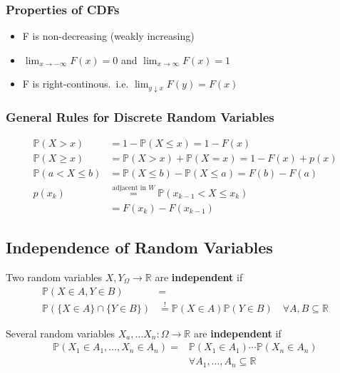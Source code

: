 \subsubsection{Properties of CDFs}
\begin{itemize}
    \item F is non-decreasing (weakly increasing)
    \item $\lim_{x\rightarrow -\infty}F(x)=0$ and $\lim_{x\rightarrow \infty}F(x)=1$
    \item F is right-continous.\ i.e. $\lim_{y\downarrow x} F(y) =F(x)$
\end{itemize}

\subsubsection{General Rules for Discrete Random Variables}
\noindent\begin{align*}
    \mathbb{P}(X>x)       & =1-\mathbb{P}(X\leq x)=1-F(x)                                   \\
    \mathbb{P}(X\geq x)   & =\mathbb{P}(X>x)+\mathbb{P}(X=x)=1-F(x)+p(x)                    \\
    \mathbb{P}(a<X\leq b) & =\mathbb{P}(X\leq b)-\mathbb{P}(X\leq a)=F(b)-F(a)              \\
    p(x_k)                & \overset{\text{adjacent in } W}{=}\mathbb{P}(x_{k-1}<X\leq x_k) \\
                          & =F(x_k)-F(x_{k-1})
\end{align*}

\subsection{Independence of Random Variables}
Two random variables $X,Y_\Omega \rightarrow\mathbb{R}$ are \textbf{independent} if
\noindent\begin{align*}
    \mathbb{P}(X\in A,Y\in B)            & =                                                                                     \\
    \mathbb{P}(\{X\in A\}\cap\{Y\in B\}) & \overset{!}{=}\mathbb{P}(X\in A)\mathbb{P}(Y\in B)\quad\forall A,B\subseteq\mathbb{R}
\end{align*}

Several random variables $X_a, \dots X_n :\Omega\rightarrow\mathbb{R}$ are \textbf{independent} if
\noindent\begin{align*}
    \mathbb{P}(X_1\in A_1,\ldots,X_n\in A_n) = & \mathbb{P}(X_1\in A_1)\cdots\mathbb{P}(X_n\in A_n) \\
                                               & \forall A_1,\ldots,A_n\subseteq\mathbb{R}
\end{align*}

